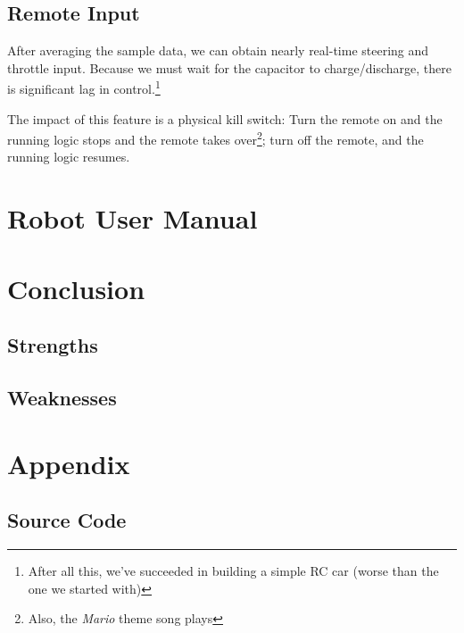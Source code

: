 \documentclass[12pt]{article}
\begin{document}
\subsection{Remote Input}
After averaging the sample data, we can obtain nearly real-time steering and throttle input.  Because we must wait for the capacitor to charge/discharge, there is significant lag in control.\footnote{After all this, we've succeeded in building a simple RC car (worse than the one we started with)}

The impact of this feature is a physical kill switch: Turn the remote on and the running logic stops and the remote takes over\footnote{Also, the \textit{Mario} theme song plays}; turn off the remote, and the running logic resumes.

\section{Robot User Manual}

\section{Conclusion}
\subsection{Strengths}
\subsection{Weaknesses}

\section{Appendix}
\subsection{Source Code}
\end{document}
